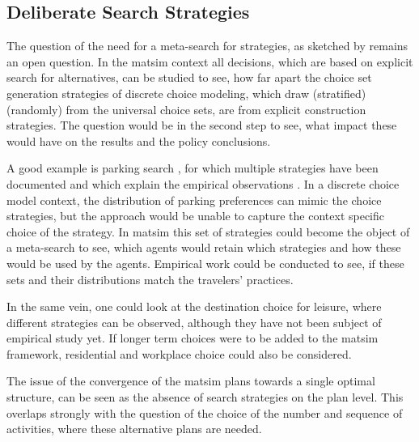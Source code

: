 \subsection{Deliberate Search Strategies}
The question of the need for a meta-search for strategies, as sketched by \citet[][]{ArthurBar} remains an open question. 
In the \gls{matsim} context all decisions, which are based on explicit search for alternatives, can be studied to see, how far apart the choice set generation strategies of discrete choice modeling, which draw (stratified) (randomly) from the universal choice sets, are from explicit construction strategies. 
The question would be in the second step to see, what impact these would have on the results and the policy conclusions. 

A good example is parking search \citep[][]{Waraich_unpub_IATBR_2012}, for which multiple strategies have been documented and which explain the empirical observations \citep[][]{Shoup_2005}. 
In a discrete choice model context, the distribution of parking preferences can mimic the choice strategies, but the approach would be unable to capture the context specific choice of the strategy. 
In \gls{matsim} this set of strategies could become the object of a meta-search to see, which agents would retain which strategies and how these would be used by the agents. 
Empirical work could be conducted to see, if these sets and their distributions match the travelers' practices. 

In the same vein, one could look at the destination choice for leisure, where different strategies can be observed, although they have not been subject of empirical study yet. 
If longer term choices were to be added to the \gls{matsim} framework, residential and workplace choice could also be considered. 

The issue of the convergence of the \gls{matsim} plans towards a single optimal structure, can be seen as the absence of search strategies on the plan level. 
This overlaps strongly with the question of the choice of the number and sequence of activities, where these alternative plans are needed. 


